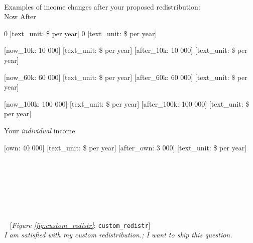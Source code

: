 \begin{enumerate}[resume]
~\\Examples of income changes after your proposed redistribution:\\

    
		Now
        After
    
    
        0 [text\_unit: \$ per year]
        0 [text\_unit: \$ per year]
    
    
        [now\_10k: 10 000] [text\_unit: \$ per year]
        [after\_10k: 10 000] [text\_unit: \$ per year]
    
    
        [now\_60k: 60 000] [text\_unit: \$ per year]
        [after\_60k: 60 000] [text\_unit: \$ per year]
    
    
        [now\_100k: 100 000] [text\_unit: \$ per year]
        [after\_100k: 100 000] [text\_unit: \$ per year]
    
    
		Your \textit{individual} income
    
    
        [own: 40 000] [text\_unit: \$ per year]
        [after\_own: 3 000] [text\_unit: \$ per year]
    


~

~
~\\

~

~

~ [\textit{Figure \ref{fig:custom_redistr}}; 
\verb|custom_redistr|]
  \\ \textit{I am satisfied with my custom redistribution.; I want to skip this question.}

\end{enumerate} 


